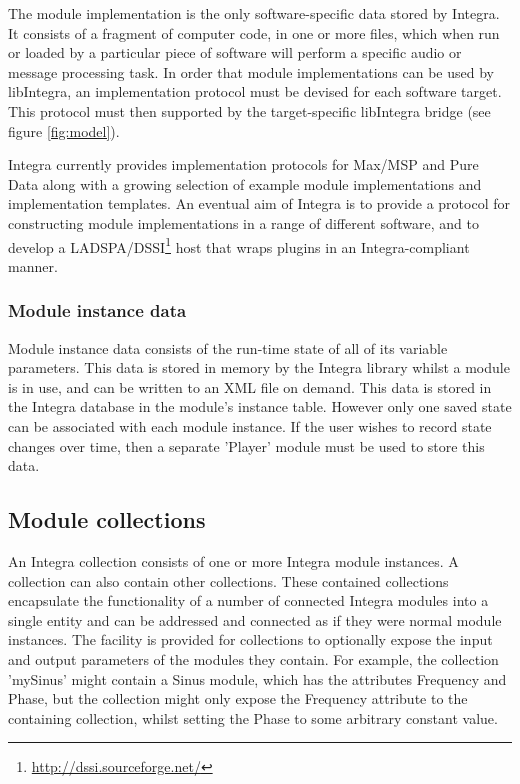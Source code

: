 The module implementation is the only software-specific data stored by Integra. It consists of a fragment of computer code, in one or more files, which when run or loaded by a particular piece of software will perform a specific audio or message processing task. In order that module implementations can be used by libIntegra, an implementation protocol must be devised for each software target. This protocol must then supported by the target-specific libIntegra bridge (see figure \ref{fig:model}).

Integra currently provides implementation protocols for Max/MSP and Pure Data along with a growing selection of example module implementations and implementation templates. An eventual aim of Integra is to provide a protocol for constructing module implementations in a range of different software, and to develop a LADSPA/DSSI\footnote{\url{http://dssi.sourceforge.net/}} host that wraps plugins in an Integra-compliant manner.

\subsubsection{Module instance data}\label{subsubsec:module_instance_data} 

Module instance data consists of the run-time state of all of its variable parameters. This data is stored in memory by the Integra library whilst a module is in use, and can be written to an XML file on demand. This data is stored in the Integra database in the module's instance table. However only one saved state can be associated with each module instance. If the user wishes to record state changes over time, then a separate 'Player' module must be used to store this data.

\subsection{Module collections}\label{subsec:module_collections}

An Integra collection consists of one or more Integra module instances. A collection can also contain other collections. These contained collections encapsulate the functionality of a number of connected Integra modules into a single entity and can be addressed and connected as if they were normal module instances. The facility is provided for collections to optionally expose the input and output parameters of the modules they contain. For example, the collection 'mySinus' might contain a Sinus module, which has the attributes Frequency and Phase, but the collection might only expose the Frequency attribute to the containing collection, whilst setting the Phase to some arbitrary constant value.

